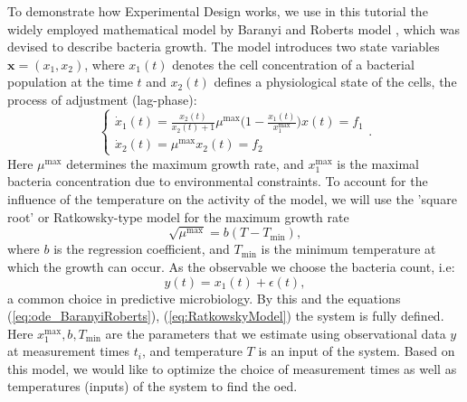 \documentclass[10pt,A4paper]{article}
\newcommand{\mbx}{\mathbf{x}}
\begin{document}
To demonstrate how Experimental Design works, we use in this tutorial the widely employed mathematical model by Baranyi and Roberts model \cite{baranyiDynamicApproach1994}, which was devised to describe bacteria growth.
The model introduces two state variables $\mbx = (x_1, x_2)$, where $x_1(t)$ denotes the cell concentration of a bacterial population at the time $t$ and $x_2(t)$ defines a physiological state of the cells, the process of adjustment (lag-phase):
\begin{equation}
    \begin{cases}
        \dot x_1(t) = \frac{x_2(t)}{x_2(t) + 1} \mu^\text{max} \big(1 - \frac{x_1(t)}{x_1^\text{max}}\big) x(t)  = f_1 \\
        \dot x_2(t) = \mu^\text{max}  x_2(t) = f_2
    \end{cases}.
    \label{eq:ode_BaranyiRoberts}
\end{equation}
Here $\mu^\text{max}$ determines the maximum growth rate, and $x_1^\text{max}$ is the maximal bacteria concentration due to environmental constraints.
To account for the influence of the temperature on the activity of the model, we will use the 'square root' or Ratkowsky-type model for the maximum growth rate~\cite{ratkowsky_relationship_1982}
\begin{equation}
    \sqrt{\mu^\text{max}} = b (T - T_\text{min}),
    \label{eq:RatkowskyModel}
\end{equation} 
where $b$ is the regression coefficient, and $T_\text{min}$ is the minimum temperature at which the growth can occur.
As the observable we choose the bacteria count, i.e:
\begin{equation}
    y(t) = x_1(t)+\epsilon(t),
 \end{equation} 
a common choice in predictive microbiology.
By this and the equations (\ref{eq:ode_BaranyiRoberts}), (\ref{eq:RatkowskyModel}) the system is fully defined.
Here $x_1^\text{max}, b, T_\text{min}$ are the parameters that we estimate using observational data $y$ at measurement times $t_i$, and temperature $T$ is an input of the system.
Based on this model, we would like to optimize the choice of measurement times as well as temperatures (inputs) of the system to find the \acl{oed}.
%
\end{document}
